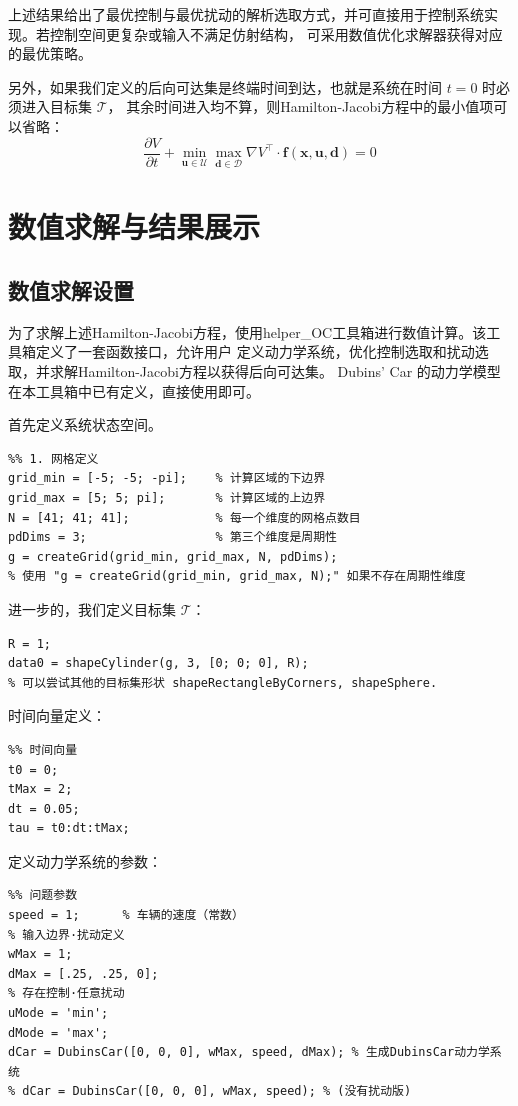 \documentclass[11pt]{ctexrep}
\begin{document}
上述结果给出了最优控制与最优扰动的解析选取方式，并可直接用于控制系统实现。若控制空间更复杂或输入不满足仿射结构，
可采用数值优化求解器获得对应的最优策略。

另外，如果我们定义的后向可达集是终端时间到达，也就是系统在时间 $t=0$ 时必须进入目标集 $\mathcal{T}$，
其余时间进入均不算，则Hamilton-Jacobi方程中的最小值项可以省略：
\begin{equation}
\frac{\partial V}{\partial t} + \min_{\mathbf{u} \in \mathcal{U}} \max_{\mathbf{d} \in \mathcal{D}} \nabla V ^\top \cdot \mathbf{f}(\mathbf{x},\mathbf{u},\mathbf{d})
 = 0    
\end{equation}


\section{数值求解与结果展示}
\subsection{数值求解设置}
为了求解上述Hamilton-Jacobi方程，使用helper\_OC工具箱进行数值计算。该工具箱定义了一套函数接口，允许用户
定义动力学系统，优化控制选取和扰动选取，并求解Hamilton-Jacobi方程以获得后向可达集。
Dubins' Car 的动力学模型在本工具箱中已有定义，直接使用即可。

首先定义系统状态空间。

\begin{verbatim}
%% 1. 网格定义
grid_min = [-5; -5; -pi];    % 计算区域的下边界
grid_max = [5; 5; pi];       % 计算区域的上边界
N = [41; 41; 41];            % 每一个维度的网格点数目
pdDims = 3;                  % 第三个维度是周期性
g = createGrid(grid_min, grid_max, N, pdDims);
% 使用 "g = createGrid(grid_min, grid_max, N);" 如果不存在周期性维度
\end{verbatim}

进一步的，我们定义目标集 $\mathcal{T}$：

\begin{verbatim}
R = 1;
data0 = shapeCylinder(g, 3, [0; 0; 0], R);
% 可以尝试其他的目标集形状 shapeRectangleByCorners, shapeSphere.
\end{verbatim}

时间向量定义：
\begin{verbatim}
%% 时间向量
t0 = 0;
tMax = 2;
dt = 0.05;
tau = t0:dt:tMax;
\end{verbatim}

定义动力学系统的参数：
\begin{verbatim}
%% 问题参数
speed = 1;      % 车辆的速度（常数）
% 输入边界·扰动定义
wMax = 1;
dMax = [.25, .25, 0];
% 存在控制·任意扰动
uMode = 'min';
dMode = 'max';    
dCar = DubinsCar([0, 0, 0], wMax, speed, dMax); % 生成DubinsCar动力学系统
% dCar = DubinsCar([0, 0, 0], wMax, speed); % (没有扰动版)
\end{verbatim}  
\end{document}
